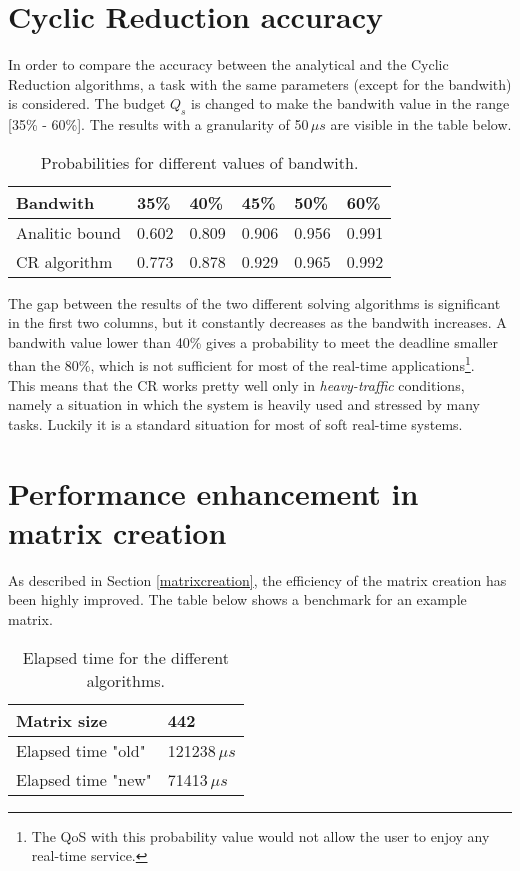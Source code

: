 \section{Cyclic Reduction accuracy} \label{craccuracy}
In order to compare the accuracy between the analytical and the Cyclic Reduction algorithms, a task with the same parameters (except for the bandwith) is considered. The budget \( Q_{s} \) is changed to make the bandwith value in the range [35\% - 60\%]. The results with a granularity of 50\,\( \mu{s} \) are visible in the table below.
\begin{table}[H]
\label{comparison}
\begin{center}
\begin{tabular}{| l | l | l | l | l | l |}
  \hline
  Bandwith & 35\% & 40\% & 45\% & 50\% & 60\% \\ \hline
  Analitic bound & 0.602 & 0.809 & 0.906 & 0.956 & 0.991 \\
  CR algorithm & 0.773 & 0.878 & 0.929 & 0.965 & 0.992 \\ \hline
\end{tabular}
\caption[]{Probabilities for different values of bandwith\footnotemark[3].}
\end{center} 
\end{table}

The gap between the results of the two different solving algorithms is significant in the first two columns, but it constantly decreases as the bandwith increases. A bandwith value lower than 40\% gives a probability to meet the deadline smaller than the 80\%, which is not sufficient for most of the real-time applications\footnote{The QoS with this probability value would not allow the user to enjoy any real-time service.}.\\
This means that the CR works pretty well only in \emph{heavy-traffic} conditions, namely a situation in which the system is heavily used and stressed by many tasks. Luckily it is a standard situation for most of soft real-time systems.  

\section{Performance enhancement in matrix creation} \label{matrixperformance}
As described in Section \ref{matrixcreation}, the efficiency of the matrix creation has been highly improved. The table below shows a benchmark for an example matrix.
\begin{table}[H]
\label{benchmark}
\begin{center}
\begin{tabular}{| l | l |}
  \hline
  Matrix size & 442 \\ \hline
  Elapsed time "old" & 121238\( \,\mu{s} \) \\ \hline
  Elapsed time "new" & 71413\( \,\mu{s} \) \\ \hline
\end{tabular}
\caption[]{Elapsed time for the different algorithms\footnotemark.}
\end{center}
\end{table}


